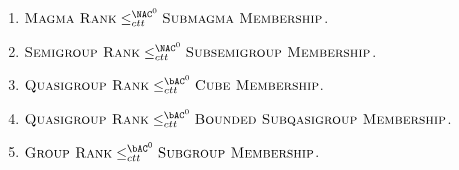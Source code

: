 \documentclass{article}
\begin{document}
\begin{lemma}\label{lem:ranktomem}
  \mbox{}
  \begin{enumerate}
  \item $\textsc{Magma Rank} \leq^{\NAC^0}_{ctt} \textsc{Submagma Membership}$.
  \item $\textsc{Semigroup Rank} \leq^{\NAC^0}_{ctt} \textsc{Subsemigroup Membership}$.
  \item $\textsc{Quasigroup Rank} \leq^{\bAC^0}_{ctt} \textsc{Cube Membership}$.
  \item $\textsc{Quasigroup Rank} \leq^{\bAC^0}_{ctt} \textsc{Bounded Subqasigroup Membership}$.
  \item $\textsc{Group Rank} \leq^{\bAC^0}_{ctt} \textsc{Subgroup Membership}$.
  \end{enumerate}
\end{lemma}
\end{document}

